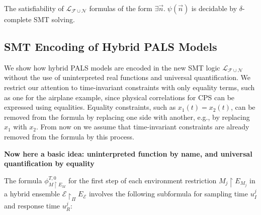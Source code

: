 \begin{theorem}
The satisfiability of $\mathcal{L}_{\mathcal{F}\cup\mathcal{N}}$ formulas of the form $\exists \vec{n}.\; \psi(\vec{n})$
is decidable by  $\delta$-complete SMT solving. 
\end{theorem}









\subsection{SMT Encoding of Hybrid PALS Models}

We show how hybrid PALS models
are encoded in the new SMT logic $\mathcal{L}_{\mathcal{F}\cup\mathcal{N}}$
without the use of uninterpreted real functions and universal quantification.
%
We restrict our attention to time-invariant constraints with only equality terms,
such as one for the airplane example,
since physical correlations for CPS can be expressed using equalities. %
Equality  constraints, such as $x_1(t) = x_2(t)$,  can be removed
from the formula  by replacing one side with another, e.g., by replacing $x_1$ with  $x_2$.
From now on we assume that time-invariant constraints are already removed from the formula by this process.


\textbf{Now here a basic idea: uninterpreted function by name, and universal quantification by equality}

The formula $\phi_{M \restriction E_M}^{T,0}$ for 
the first step of 
each environment restriction $M_j \restriction E_{M_j}$ in a hybrid ensemble $\mathcal{E} \restriction_{\Pi} E_\mathcal{E}$
involves the following subformula for sampling time $u_I^j$ and response time $u_R^j$:


